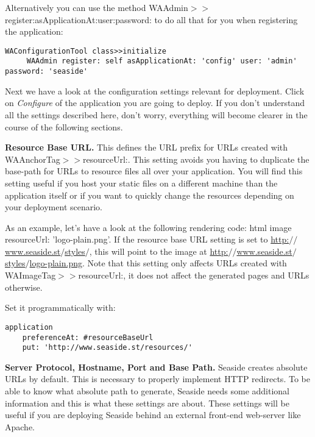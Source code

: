 \documentclass[a4paper,10pt,twoside]{book}
\newcommand{\ct}[1]{{\small\ttfamily\textup{#1}}}
\begin{document}
Alternatively you can use the method \ct{WAAdmin$>$$>$register:asApplicationAt:user:password:} to do all that for you when registering the application:

\begin{lstlisting}
WAConfigurationTool class>>initialize
     WAAdmin register: self asApplicationAt: 'config' user: 'admin' password: 'seaside'
\end{lstlisting}

Next we have a look at the configuration settings relevant for deployment. Click on \textit{Configure} of the application you are going to deploy. If you don't understand all the settings described here, don't worry, everything will become clearer in the course of the following sections.

\textbf{Resource Base URL.} This defines the URL prefix for URLs created with  \ct{WAAnchorTag$>$$>$resourceUrl:}. This setting avoids you having to duplicate the base-path for URLs to resource files all over your application. You will find this setting useful if you host your static files on a different machine than the application itself or if you want to quickly change the resources depending on your deployment scenario.

As an example, let's have a look at the following rendering code: \ct{html image resourceUrl: 'logo-plain.png'}. If the resource base URL setting is set to \href{http://www.seaside.st/styles/}{http:$/$$/$www.seaside.st$/$styles$/$}, this will point to the image at \href{http://www.seaside.st/styles/logo-plain.png}{http:$/$$/$www.seaside.st$/$styles$/$logo-plain.png}. Note that this setting only affects URLs created with \ct{WAImageTag$>$$>$resourceUrl:}, it does not affect the generated pages and URLs otherwise.

Set it programmatically with:

\begin{lstlisting}
application
    preferenceAt: #resourceBaseUrl
    put: 'http://www.seaside.st/resources/'
\end{lstlisting}

\textbf{Server Protocol, Hostname, Port and Base Path.} Seaside creates absolute URLs by default. This is necessary to properly implement HTTP redirects. To be able to know what absolute path to generate, Seaside needs some additional information and this is what these settings are about. These settings will be useful if you are deploying Seaside behind an external front-end web-server like Apache.
\end{document}
